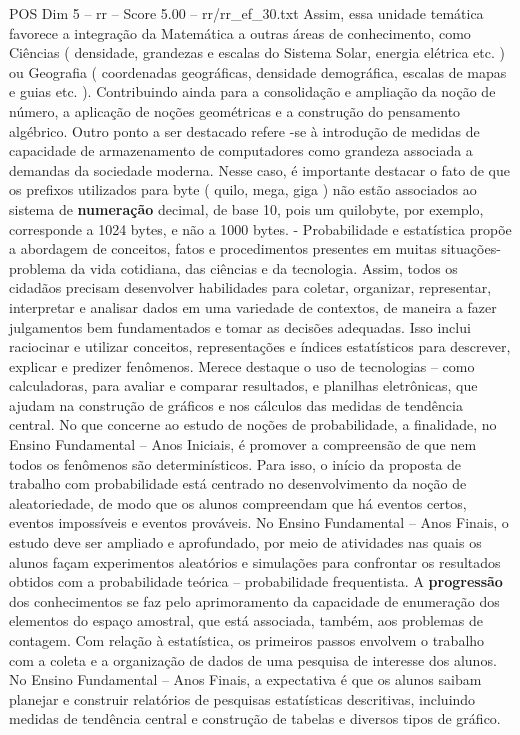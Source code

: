 \begin{textsample}{POS Dim 5 – rr – Score 5.00 – rr/rr\_ef\_30.txt}
Assim, essa unidade temática favorece a integração da Matemática a outras áreas de conhecimento, como Ciências ( densidade, grandezas e escalas do Sistema Solar, energia elétrica etc. ) ou Geografia ( coordenadas geográficas, densidade demográfica, escalas de mapas e guias etc. ).
Contribuindo ainda para a consolidação e ampliação da noção de número, a aplicação de noções geométricas e a construção do pensamento algébrico.
Outro ponto a ser destacado refere -se à introdução de medidas de capacidade de armazenamento de computadores como grandeza associada a demandas da sociedade moderna.
Nesse caso, é importante destacar o fato de que os prefixos utilizados para byte ( quilo, mega, giga ) não estão associados ao sistema de \textbf{numeração} decimal, de base 10, pois um quilobyte, por exemplo, corresponde a 1024 bytes, e não a 1000 bytes. - Probabilidade e estatística propõe a abordagem de conceitos, fatos e procedimentos presentes em muitas situações-problema da vida cotidiana, das ciências e da tecnologia.
Assim, todos os cidadãos precisam desenvolver habilidades para coletar, organizar, representar, interpretar e analisar dados em uma variedade de contextos, de maneira a fazer julgamentos bem fundamentados e tomar as decisões adequadas.
Isso inclui raciocinar e utilizar conceitos, representações e índices estatísticos para descrever, explicar e predizer fenômenos.
Merece destaque o uso de tecnologias – como calculadoras, para avaliar e comparar resultados, e planilhas eletrônicas, que ajudam na construção de gráficos e nos cálculos das medidas de tendência central.
No que concerne ao estudo de noções de probabilidade, a finalidade, no Ensino Fundamental – Anos Iniciais, é promover a compreensão de que nem todos os fenômenos são determinísticos.
Para isso, o início da proposta de trabalho com probabilidade está centrado no desenvolvimento da noção de aleatoriedade, de modo que os alunos compreendam que há eventos certos, eventos impossíveis e eventos prováveis.
No Ensino Fundamental – Anos Finais, o estudo deve ser ampliado e aprofundado, por meio de atividades nas quais os alunos façam experimentos aleatórios e simulações para confrontar os resultados obtidos com a probabilidade teórica – probabilidade frequentista.
A \textbf{progressão} dos conhecimentos se faz pelo aprimoramento da capacidade de enumeração dos elementos do espaço amostral, que está associada, também, aos problemas de contagem.
Com relação à estatística, os primeiros passos envolvem o trabalho com a coleta e a organização de dados de uma pesquisa de interesse dos alunos.
No Ensino Fundamental – Anos Finais, a expectativa é que os alunos saibam planejar e construir relatórios de pesquisas estatísticas descritivas, incluindo medidas de tendência central e construção de tabelas e diversos tipos de gráfico.

\end{textsample}
